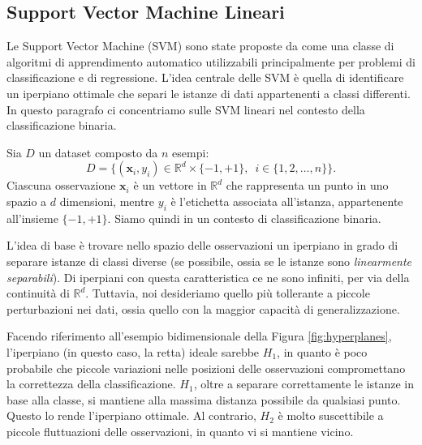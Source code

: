 \subsection{Support Vector Machine Lineari}
\label{par:svm}
Le Support Vector Machine (SVM) sono state proposte da \textcite{cortes1995svm} come una classe di algoritmi di apprendimento automatico utilizzabili principalmente per problemi di classificazione e di regressione. L'idea centrale delle SVM è quella di identificare un iperpiano ottimale che separi le istanze di dati appartenenti a classi differenti. \\
In questo paragrafo ci concentriamo sulle SVM lineari nel contesto della classificazione binaria.

Sia $D$ un dataset composto da $n$ esempi:
\begin{equation}
    D = \{ (\mathbf{x}_i, y_i) \in \mathbb{R}^d \times \{-1,+1 \}, \enspace i \in \{1,2, \dots, n \} \}.
\end{equation}
Ciascuna osservazione $\mathbf{x}_i$ è un vettore in $\mathbb{R}^d$ che rappresenta un punto in uno spazio a $d$ dimensioni, 
mentre $y_i$ è l’etichetta associata all’istanza, appartenente all’insieme $\{-1, +1\}$. Siamo quindi in un contesto di classificazione binaria.

L'idea di base è trovare nello spazio delle osservazioni un iperpiano in grado di separare istanze di classi diverse (se possibile, ossia se le istanze sono \textit{linearmente separabili}). Di iperpiani con questa caratteristica ce ne sono infiniti, per via della continuità di $\mathbb{R}^d$. Tuttavia, noi desideriamo quello più tollerante a piccole perturbazioni nei dati, ossia quello con la maggior capacità di generalizzazione. 

Facendo riferimento all'esempio bidimensionale della Figura \ref{fig:hyperplanes}, l'iperpiano (in questo caso, la retta) ideale sarebbe $H_1$, in quanto è poco probabile che piccole variazioni nelle posizioni delle osservazioni compromettano la correttezza della classificazione. $H_1$, oltre a separare correttamente le istanze in base alla classe, si mantiene alla massima distanza possibile da qualsiasi punto. Questo lo rende l'iperpiano ottimale. Al contrario, $H_2$ è molto suscettibile a piccole fluttuazioni delle osservazioni, in quanto vi si mantiene vicino.

